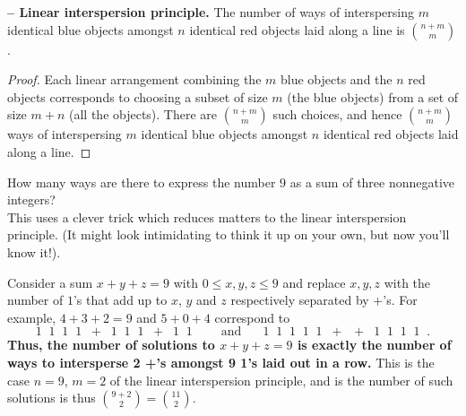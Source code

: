 \documentclass[11pt,dvipsnames]{book}
\numberwithin{figure}{section} %
\numberwithin{table}{section} %
\begin{document}
\begin{proposition}\label{interspersion} {\bf -- Linear interspersion principle.}
The number of ways of interspersing $m$ identical blue objects amongst $n$ identical red objects laid along a line is $n+m \choose m$.
\end{proposition}
\begin{proof}
Each linear arrangement combining the $m$ blue objects and the $n$ red objects corresponds to choosing a subset of size $m$ (the blue objects) from a set of size $m+n$ (all the objects). There are $n+m \choose m$ such choices, and hence $n+m \choose m$ ways of interspersing $m$ identical blue objects amongst $n$ identical red objects laid along a line.
\end{proof}

\begin{example}
\label{ex:1+'s}
How many ways are there to express the number $9$ as a sum of three nonnegative integers? \\

This uses a clever trick which reduces matters to the linear interspersion principle. (It might look intimidating to think it up on your own, but now you'll know it!).

Consider a sum $x+y+z=9$ with $0\leq x,y,z\leq 9$ and replace $x,y,z$ with the number of $1$'s that add up to $x$, $y$ and $z$ respectively separated by $+$'s. For example, $4+3+2=9$ and $5+0+4$ correspond to
\[
1\;\; 1\;\; 1\;\; 1\;\; + \;\;1\;\; 1\;\; 1\;\; +\;\;1\;\; 1\;\; \;\;\;\;\;\mbox{ and }\;\;\;\;\;
1\;\; 1\;\; 1\;\; 1\;\;  1 \;\; + \;\; + \;\; 1\;\; 1\;\; 1\;\; 1\;\; .
\]
{\bf Thus, the number of solutions to $x+y+z=9$ is exactly the number of ways to intersperse 2 +'s amongst 9 1's laid out in a row.} This is the case $n=9$, $m=2$ of the linear interspersion principle, and is the number of such solutions is thus ${9+2 \choose 2} = {11\choose 2}$.
\end{example}
\end{document}
